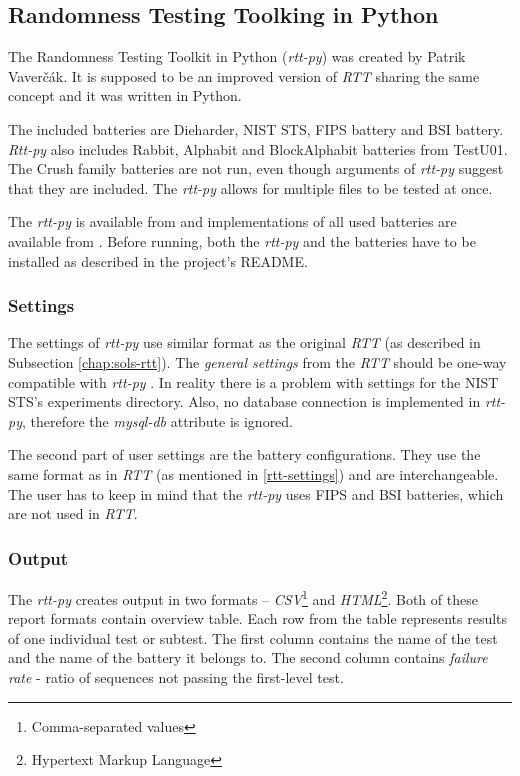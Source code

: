 \documentclass[
  digital,     %
  oneside,     %
  nosansbold,  %
  nocolorbold, %
  nolof,         %
  nolot,         %
]{fithesis4}
\begin{document}
\subsection{Randomness Testing Toolking in Python} \label{chap:sols-rtt-py}
The Randomness Testing Toolkit in Python (\emph{rtt-py}) was created by Patrik Vaverčák. It is supposed to be an improved version of \emph{RTT} sharing the same concept \cite[p.~24]{vavercak} and it was written in Python.

The included batteries are Dieharder, NIST STS, FIPS battery and BSI battery. \emph{Rtt-py} also includes Rabbit, Alphabit and BlockAlphabit batteries from TestU01. The Crush family batteries are not run, even though arguments of \emph{rtt-py} suggest that they are included. The \emph{rtt-py} allows for multiple files to be tested at once.


The \emph{rtt-py} is available from \cite{rtt-py-site} and implementations of all used batteries are available from \cite{rtt-py-batteries}. Before running, both the \emph{rtt-py} and the batteries have to be installed as described in the project's README.



\subsubsection{Settings}
The settings of \emph{rtt-py} use similar format as the original \emph{RTT} (as described in Subsection \ref{chap:sols-rtt}). The \emph{general settings} from the \emph{RTT} should be one-way compatible with \emph{rtt-py} \cite[p. 25]{vavercak}. In reality there is a problem with settings for the NIST STS's experiments directory. Also, no database connection is implemented in \emph{rtt-py}, therefore the \emph{mysql-db} attribute is ignored. \cite{rtt-py-site}

The second part of user settings are the battery configurations. They use the same format as in \emph{RTT} (as mentioned in \ref{rtt-settings}) and are interchangeable.~\cite[p.~25]{vavercak} The user has to keep in mind that the \emph{rtt-py} uses FIPS and BSI batteries, which are not used in \emph{RTT}. 

\subsubsection{Output}
The \emph{rtt-py} creates output in two formats -- \emph{CSV}\footnote{Comma-separated values} and \emph{HTML}\footnote{Hypertext Markup Language}. \cite[p. 36]{vavercak} Both of these report formats contain overview table. Each row from the table represents results of one individual test or subtest. The first column contains the name of the test and the name of the battery it belongs to. The second column contains \emph{failure rate} - ratio of sequences not passing the first-level test.
\end{document}
